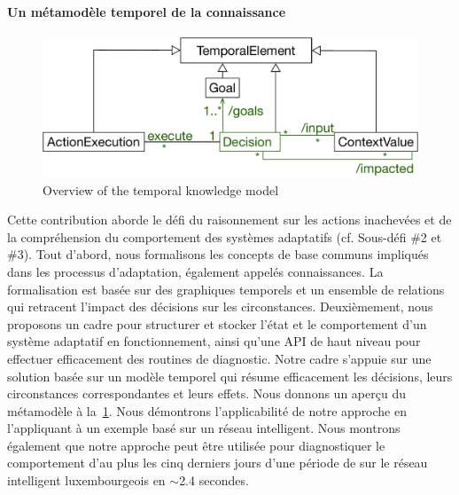 \paragraph{Un métamodèle temporel de la connaissance}
\begin{figure}
	\centering
	\includegraphics[width=0.6\linewidth]{img/chapt-intro/approach/tkm-overview}
	\caption{Overview of the temporal knowledge model}
	\label{fig:french:contrib:tkm}
\end{figure}

%
Cette contribution aborde le défi du raisonnement sur les actions inachevées et de la compréhension du comportement des systèmes adaptatifs (cf. Sous-défi \#2 et \#3). 
Tout d'abord, nous formalisons les concepts de base communs impliqués dans les processus d'adaptation, également appelés connaissances. 
La formalisation est basée sur des graphiques temporels et un ensemble de relations qui retracent l'impact des décisions sur les circonstances. 
Deuxièmement, nous proposons un cadre pour structurer et stocker l'état et le comportement d'un système adaptatif en fonctionnement, ainsi qu'une API de haut niveau pour effectuer efficacement des routines de diagnostic. 
Notre cadre s'appuie sur une solution basée sur un modèle temporel qui résume efficacement les décisions, leurs circonstances correspondantes et leurs effets. 
Nous donnons un aperçu du métamodèle à la~\cref{fig:french:contrib:tkm}. 
Nous démontrons l'applicabilité de notre approche en l'appliquant à un exemple basé sur un réseau intelligent. 
Nous montrons également que notre approche peut être utilisée pour diagnostiquer le comportement d'au plus les cinq derniers jours d'une période de sur le réseau intelligent luxembourgeois en $\sim$2.4 secondes.

